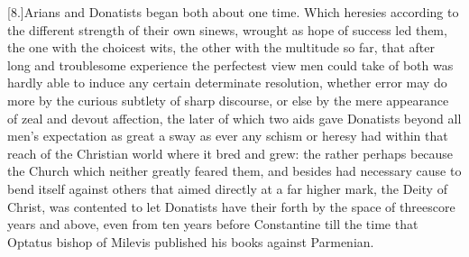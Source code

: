 [8.]Arians and Donatists began both about one time. Which heresies according to the different strength of their own sinews, wrought as hope of success led them, the one with the choicest wits, the other with the multitude so far, that after long and troublesome experience the perfectest view men could take of both was hardly able to induce any certain determinate resolution, whether error may do more by the curious subtlety of sharp discourse, or else by the mere appearance of zeal and devout affection, the later of which two aids gave Donatists beyond all men’s expectation as great a sway as ever any schism or heresy had within that reach of the Christian world where it bred and grew: the rather perhaps because the Church which neither greatly feared them, and besides had necessary cause to bend itself against others that aimed directly at a far higher mark, the Deity of Christ, was contented to let Donatists have their forth by the space of threescore years and above, even from ten years before Constantine till the time that Optatus bishop of Milevis published his books against Parmenian.

